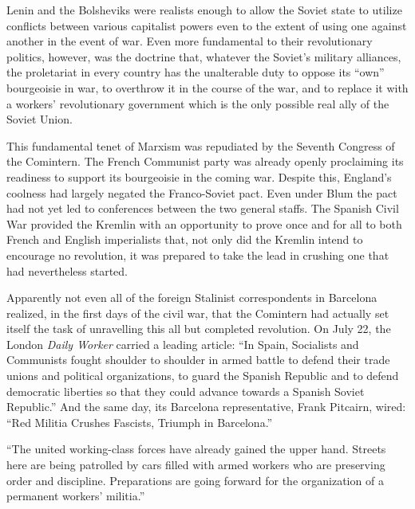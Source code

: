 Lenin and the Bolsheviks were realists enough to allow the Soviet state to utilize conflicts between various capitalist powers even to the extent of using one against another in the event of war. Even more fundamental to their revolutionary politics, however, was the doctrine that, whatever the Soviet’s military alliances, the proletariat in every country has the unalterable duty to oppose its ``own'' bourgeoisie in war, to overthrow it in the course of the war, and to replace it with a workers’ revolutionary government which is the only possible real ally of the Soviet Union.

This fundamental tenet of Marxism was repudiated by the Seventh Congress of the Comintern. The French Communist party was already openly proclaiming its readiness to support its bourgeoisie in the coming war. Despite this, England’s coolness had largely negated the Franco-Soviet pact. Even under Blum the pact had not yet led to conferences between the two general staffs. The Spanish Civil War provided the Kremlin with an opportunity to prove once and for all to both French and English imperialists that, not only did the Kremlin intend to encourage no revolution, it was prepared to take the lead in crushing one that had nevertheless started.

Apparently not even all of the foreign Stalinist correspondents in Barcelona realized, in the first days of the civil war, that the Comintern had actually set itself the task of unravelling this all but completed revolution. On July 22, the London \emph{Daily Worker} carried a leading article: ``In Spain, Socialists and Communists fought shoulder to shoulder in armed battle to defend their trade unions and political organizations, to guard the Spanish Republic and to defend democratic liberties so that they could advance towards a Spanish Soviet Republic.'' And the same day, its Barcelona representative, Frank Pitcairn, wired: ``Red Militia Crushes Fascists, Triumph in Barcelona.''

``The united working-class forces have already gained the upper hand. Streets here are being patrolled by cars filled with armed workers who are preserving order and discipline. Preparations are going forward for the organization of a permanent workers’ militia.''

